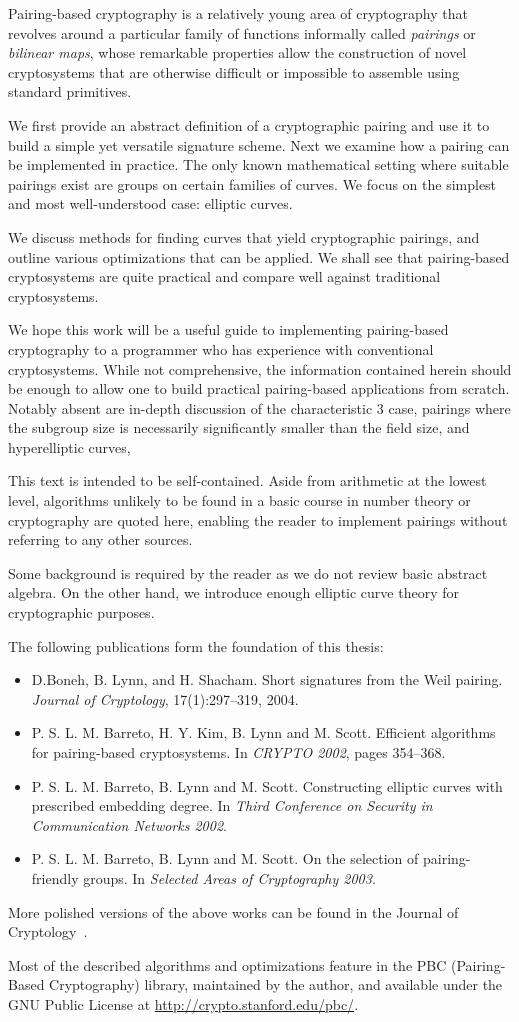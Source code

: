 \beforepreface
{}
Pairing-based cryptography is a relatively young area of cryptography that
revolves around a particular family of functions informally called
\emph{pairings} or \emph{bilinear maps}, whose remarkable properties allow the
construction of novel cryptosystems that are otherwise difficult or impossible
to assemble using standard primitives.

We first provide an abstract definition of a cryptographic pairing and use it
to build a simple yet versatile signature scheme. Next we examine how a pairing
can be implemented in practice. The only known mathematical setting where
suitable pairings exist are groups on certain families of curves. We focus on
the simplest and most well-understood case: elliptic curves.

We discuss methods for finding curves that yield cryptographic pairings, and
outline various optimizations that can be applied. We shall see that
pairing-based cryptosystems are quite practical and compare well against
traditional cryptosystems.

We hope this work will be a useful guide to implementing pairing-based
cryptography to a programmer who has experience with conventional
cryptosystems. While not comprehensive, the information contained herein should
be enough to allow one to build practical pairing-based applications from
scratch. Notably absent are in-depth discussion of the characteristic 3 case,
pairings where the subgroup size is necessarily significantly smaller than the
field size, and hyperelliptic curves,

This text is intended to be self-contained. Aside from arithmetic at the lowest
level, algorithms unlikely to be found in a basic course in number theory or
cryptography are quoted here, enabling the reader to implement pairings without
referring to any other sources.

Some background is required by the reader as we do not review basic abstract
algebra. On the other hand, we introduce enough elliptic curve theory for
cryptographic purposes.

The following publications form the foundation of this thesis:
\begin{itemize}
\item D.Boneh, B. Lynn, and H. Shacham. Short signatures from the Weil pairing.
{\it Journal of Cryptology}, 17(1):297--319, 2004.
\item
P. S. L. M. Barreto, H. Y. Kim, B. Lynn and M. Scott.
Efficient algorithms for pairing-based cryptosystems. In {\it CRYPTO 2002},
pages 354--368.
\item P. S. L. M. Barreto, B. Lynn and M. Scott.
Constructing elliptic curves with prescribed embedding degree. In {\it Third
Conference on Security in Communication Networks 2002}.
\item P. S. L. M. Barreto, B. Lynn and M. Scott.
On the selection of pairing-friendly groups. In {\it Selected Areas of Cryptography 2003}.
\end{itemize}
More polished versions of the above works can be found
in the Journal of Cryptology~\cite{blsjournal, balsjournal}.

Most of the described algorithms and optimizations feature in the PBC
(Pairing-Based Cryptography) library, maintained by the author, and available
under the GNU Public License at \url{http://crypto.stanford.edu/pbc/}.
